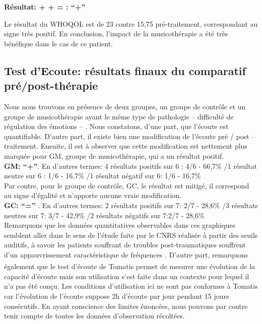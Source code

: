                 \textbf{ Résultat:  +  +  =     : ``+''}
                
                
    Le résultat du WHOQOL est de  23 contre 15,75 pré-traitement, correspondant
    au signe très positif. En conclusion, l'impact de la musicothérapie a été très bénéfique dans le cas de 
    ce patient.           

 


\subsection{Test d'Ecoute: résultats finaux du comparatif pré/post-thérapie}
 Nous nous trouvons
           en présence de deux groupes, un groupe de contrôle et un
           groupe de musicothérapie ayant le même type de
           pathologie -- difficulté de régulation des émotions -- .
Nous constatons, d'une part, que l'écoute est quantifiable.
           D'autre part, il existe bien
          une modification de l'écoute pré / post -- traitement.
Ensuite, il est à observer que
          cette modification est nettement plus marquée
          pour GM, groupe de musicothérapie, qui a un résultat positif.
          \\
 \textbf{GM: ``+''}.
          En d'autres termes: 4 résultats positifs sur 6 : 4/6 - 66,7\%
/1 résultat neutre sur 6 : 1/6 - 16,7\%
/1 résultat négatif sur 6: 1/6 - 16,7\%
\\
Par contre,  pour le groupe de contrôle, GC, le résultat est mitigé, il correspond au signe d'égalité et n'apporte aucune vraie modification.
\\
          \textbf{GC:  ``='' }.
En d'autres termes:  2 résultats positifs sur 7: 2/7 - 28,6\%
/3 résultats neutres sur 7: 3/7 - 42,9\%
/2 résultats négatifs sur 7:2/7 - 28,6\%
\\
Remarquons que les données quantitatives observables dans
ces graphiques sem\-blent aller dans le
sens de  l'étude faite par le
CNRS  réalisée à partir des seuils auditifs, à savoir
les patients souffrant de troubles post-traumatiques souffrent d'un
appauvrissement caractéristique de fréquences \autocite{affectiveDisorders}.
D'autre part, remarquons également que le test d'écoute de Tomatis\textsuperscript \textregistered 
permet de mesurer une évolution de la capacité d'écoute mais son 
utilisation s'est faite dans un contexte pour lequel il n'a pas été conçu. Les conditions d'utilisation ici ne 
sont pas conformes à Tomatis car l'évolution de l'écoute suppose 2h d'écoute par jour pendant 15 jours 
consécutifs. En ayant conscience des limites énoncées, nous pouvons par contre tenir compte de toutes 
les 
données d'observation récoltées.%
 
